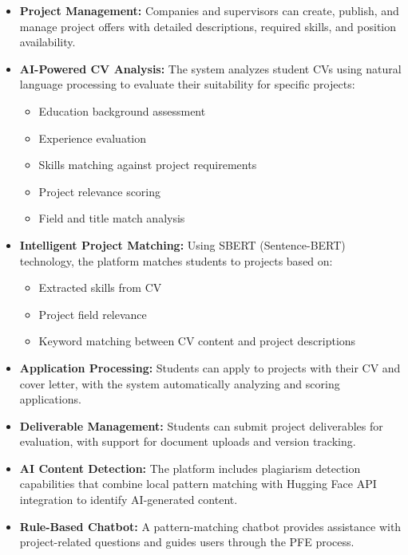 \documentclass[12pt,a4paper]{report}
\begin{document}
\begin{itemize}
    \item \textbf{Project Management:} Companies and supervisors can create, publish, and manage project offers with detailed descriptions, required skills, and position availability.

    \item \textbf{AI-Powered CV Analysis:} The system analyzes student CVs using natural language processing to evaluate their suitability for specific projects:
    \begin{itemize}
        \item Education background assessment
        \item Experience evaluation
        \item Skills matching against project requirements
        \item Project relevance scoring
        \item Field and title match analysis
    \end{itemize}

    \item \textbf{Intelligent Project Matching:} Using SBERT (Sentence-BERT) technology, the platform matches students to projects based on:
    \begin{itemize}
        \item Extracted skills from CV
        \item Project field relevance
        \item Keyword matching between CV content and project descriptions
    \end{itemize}

    \item \textbf{Application Processing:} Students can apply to projects with their CV and cover letter, with the system automatically analyzing and scoring applications.

    \item \textbf{Deliverable Management:} Students can submit project deliverables for evaluation, with support for document uploads and version tracking.

    \item \textbf{AI Content Detection:} The platform includes plagiarism detection capabilities that combine local pattern matching with Hugging Face API integration to identify AI-generated content.

    \item \textbf{Rule-Based Chatbot:} A pattern-matching chatbot provides assistance with project-related questions and guides users through the PFE process.
\end{itemize}
\end{document}
